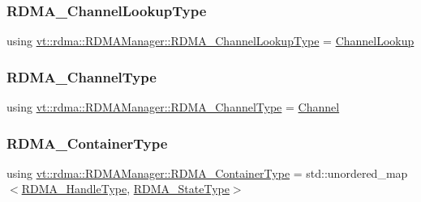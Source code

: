 \subsubsection{\texorpdfstring{R\+D\+M\+A\+\_\+\+Channel\+Lookup\+Type}{RDMA\_ChannelLookupType}}
{\footnotesize\ttfamily using \hyperlink{structvt_1_1rdma_1_1_r_d_m_a_manager_a3df5b264f344d9d4530a96264782a725}{vt\+::rdma\+::\+R\+D\+M\+A\+Manager\+::\+R\+D\+M\+A\+\_\+\+Channel\+Lookup\+Type} =  \hyperlink{structvt_1_1rdma_1_1_channel_lookup}{Channel\+Lookup}}

\mbox{\label{structvt_1_1rdma_1_1_r_d_m_a_manager_ad6a7e417dca07fe5743318e1153677a8}} 
\subsubsection{\texorpdfstring{R\+D\+M\+A\+\_\+\+Channel\+Type}{RDMA\_ChannelType}}
{\footnotesize\ttfamily using \hyperlink{structvt_1_1rdma_1_1_r_d_m_a_manager_ad6a7e417dca07fe5743318e1153677a8}{vt\+::rdma\+::\+R\+D\+M\+A\+Manager\+::\+R\+D\+M\+A\+\_\+\+Channel\+Type} =  \hyperlink{structvt_1_1rdma_1_1_channel}{Channel}}

\mbox{\label{structvt_1_1rdma_1_1_r_d_m_a_manager_a55dd81ff646ebb9d61ebf3a7239ec3b8}} 
\subsubsection{\texorpdfstring{R\+D\+M\+A\+\_\+\+Container\+Type}{RDMA\_ContainerType}}
{\footnotesize\ttfamily using \hyperlink{structvt_1_1rdma_1_1_r_d_m_a_manager_a55dd81ff646ebb9d61ebf3a7239ec3b8}{vt\+::rdma\+::\+R\+D\+M\+A\+Manager\+::\+R\+D\+M\+A\+\_\+\+Container\+Type} =  std\+::unordered\+\_\+map$<$\hyperlink{namespacevt_a10442579ec4e7ebef223818e64bcf908}{R\+D\+M\+A\+\_\+\+Handle\+Type}, \hyperlink{structvt_1_1rdma_1_1_r_d_m_a_manager_aad42879902ea82c4de357ad482d9333d}{R\+D\+M\+A\+\_\+\+State\+Type}$>$}

